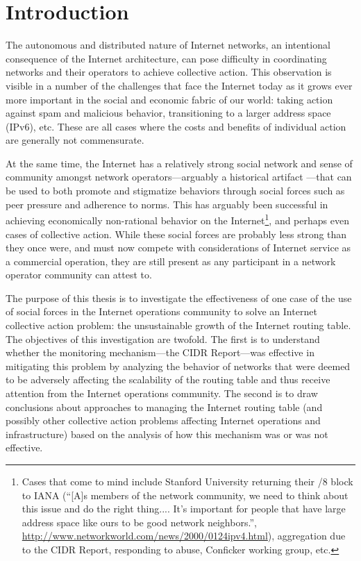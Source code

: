 \chapter{Introduction}
\label{chap:intro}

The autonomous and distributed nature of Internet networks, an intentional consequence of the Internet architecture, can pose difficulty in coordinating networks and their operators to achieve collective action. This observation is visible in a number of the challenges that face the Internet today as it grows ever more important in the social and economic fabric of our world: taking action against spam and malicious behavior, transitioning to a larger address space (IPv6), etc. These are all cases where the costs and benefits of individual action are generally not commensurate. 

At the same time, the Internet has a relatively strong social network and sense of community amongst network operators---arguably a historical artifact \cite{Mathew:2010ly}---that can be used to both promote and stigmatize behaviors through social forces such as peer pressure and adherence to norms. This has arguably been successful in achieving economically non-rational behavior on the Internet\footnote{Cases that come to mind include Stanford University returning their /8 block to IANA (``[A]s members of the network community, we need to think about this issue and do the right thing.... It's important for people that have large address space like ours to be good network neighbors.'', \url{http://www.networkworld.com/news/2000/0124ipv4.html}), aggregation due to the CIDR Report, responding to abuse, Conficker working group, etc.}, and perhaps even cases of collective action. While these social forces are probably less strong than they once were, and must now compete with considerations of Internet service as a commercial operation, they are still present as any participant in a network operator community can attest to. 

The purpose of this thesis is to investigate the effectiveness of one case of the use of social forces in the Internet operations community to solve an Internet collective action problem: the unsustainable growth of the Internet routing table. The objectives of this investigation are twofold. The first is to understand whether the monitoring mechanism---the CIDR Report---was effective in mitigating this problem by analyzing the behavior of networks that were deemed to be adversely affecting the scalability of the routing table and thus receive attention from the Internet operations community. The second is to draw conclusions about approaches to managing the Internet routing table (and possibly other collective action problems affecting Internet operations and infrastructure) based on the analysis of how this mechanism was or was not effective.
%

